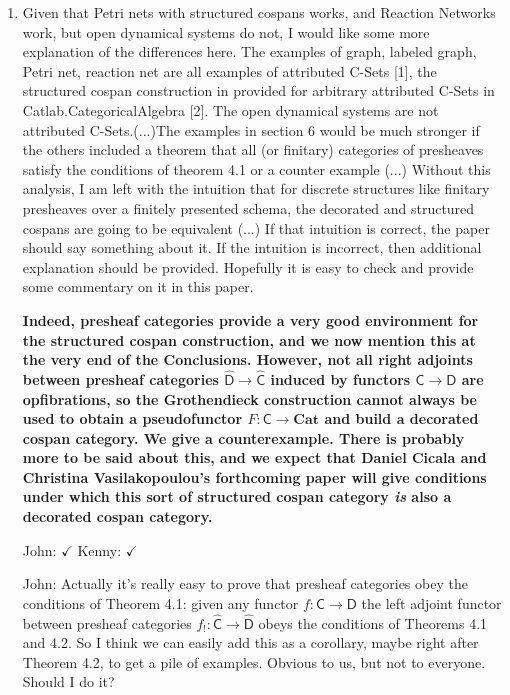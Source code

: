 \documentclass[reqno]{amsart}
\def\john{\color{red} John: }
\def\kenny{\color{blue} Kenny: }
\begin{document}
\begin{enumerate}
\fi 

\item Given that Petri nets with structured cospans works, and Reaction Networks work, but open dynamical systems do not, I would like some more 
explanation of the differences here. The examples of graph, labeled 
graph, Petri net, reaction net are all examples of attributed C-Sets [1], the structured cospan construction in provided for arbitrary attributed 
C-Sets in Catlab.CategoricalAlgebra [2]. The open dynamical systems are not attributed C-Sets.(...)The examples in section 6 would be much stronger 
if the others included a theorem that all (or finitary) categories of presheaves satisfy the 
conditions of theorem 4.1 or a counter example (...) Without this analysis, I am left with the intuition
that for discrete structures like finitary presheaves over a finitely presented schema, the decorated and structured cospans are going
to be equivalent (...) If that intuition is correct, the paper should say something about it. If the intuition is incorrect, then additional 
explanation should be provided. Hopefully it is easy to check and provide some commentary on it in this paper.

{\bf  Indeed, presheaf categories provide a very good environment for the structured cospan construction, and we now mention this at the very end of the Conclusions.  However, not all right adjoints between presheaf categories $\widehat{\mathsf{D}} \to \widehat{\mathsf{C}}$ induced by functors $\mathsf{C} \to \mathsf{D}$ are opfibrations, so the Grothendieck construction cannot always be used to obtain a pseudofunctor $F \colon \mathsf{C} \to \mathbf{Cat}$ and build a decorated cospan category.   We give a counterexample.   There is probably more to be said about this, and we expect that Daniel Cicala and Christina Vasilakopoulou's forthcoming paper will give
conditions under which this sort of structured cospan category \emph{is} also a decorated cospan
category.}

{\john $\checkmark$} {\kenny $\checkmark$}

\iffalse
{\john Actually it's really easy to prove that presheaf categories obey the conditions of Theorem 4.1:
given any functor $f : \mathsf{C} \to \mathsf{D}$ the left adjoint functor between presheaf categories $f_! : \widehat{\mathsf{C}} \to \widehat{\mathsf{D}}$ obeys the conditions of Theorems 4.1 and 4.2.   So I think we can easily add this as a corollary, maybe right after Theorem 4.2, to get a pile of examples.   Obvious to us, but not to everyone.  Should I do it?}


\end{enumerate}
\end{document}
